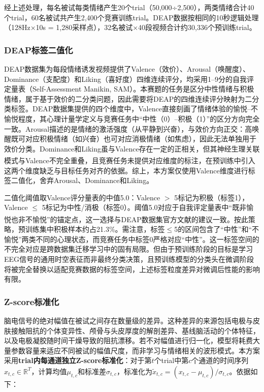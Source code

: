 \documentclass[UTF8,zihao=-4,fontset=windows]{ctexart}
\let\oldcite\cite
\renewcommand{\cite}[1]{\textsuperscript{\oldcite{#1}}}
\numberwithin{equation}{section}
\numberwithin{figure}{section}
\numberwithin{table}{section}
\begin{document}
经上述处理，每名被试每类情绪产生20个trial（50,000÷2,500），两类情绪合计40个trial，60名被试共产生2,400个竞赛训练trial。DEAP数据按相同的10秒逻辑处理（128Hz×10s = 1,280采样点），32名被试×40段视频合计约30,336个预训练trial。

\subsubsection{DEAP标签二值化}

DEAP数据集为每段情绪诱发视频提供了Valence（效价）、Arousal（唤醒度）、Dominance（支配度）和Liking（喜好度）四维连续评分，均采用1--9分的自我评定量表（Self-Assessment Manikin, SAM）。本赛题的任务是区分中性情绪与积极情绪，属于基于效价的二分类问题，因此需要将DEAP的四维连续评分映射为二分类标签。DEAP数据集提供的四个维度中，Valence直接刻画了情绪体验的愉悦--不愉悦程度，其心理计量学定义与竞赛任务中“中性（0）--积极（1）”的区分方向完全一致。Arousal描述的是情绪的激活强度（从平静到兴奋），与效价方向正交：高唤醒既可对应积极情绪（如兴奋）也可对应消极情绪（如焦虑），因此无法单独用于效价分类。Dominance和Liking虽与Valence存在一定的正相关，但其神经生理关联模式与Valence不完全重叠\cite{deap}，且竞赛任务未提供对应维度的标注，在预训练中引入这两个维度缺乏与目标任务对齐的依据。综上，本方案仅使用Valence维度进行标签二值化，舍弃Arousal、Dominance和Liking。

二值化阈值取Valence评分量表的中值5.0：Valence $>$ 5标记为积极（标签1），Valence $\leq$ 5标记为中性/消极（标签0）。阈值5.0对应于自我评定量表中“既非愉悦也非不愉悦”的锚定点，这一选择与DEAP数据集官方文献的建议一致\cite{deap}。按此策略，预训练集中积极样本约占21.3\%。需注意，标签$\leq$5的区间包含了“中性”和“不愉悦”两类不同的心理状态，而竞赛任务中标签0严格对应“中性”。这一标签空间的不完全对应是跨数据集迁移学习中的固有局限。但由于预训练阶段的目标是学习EEG信号的通用时空表征而非最终分类决策，且预训练模型的分类头在微调阶段将被完全替换以适配竞赛数据的标签空间，上述标签粒度差异对微调后性能的影响有限。

\subsubsection{Z-score标准化}

脑电信号的绝对幅值在被试之间存在数量级的差异。这种差异的来源包括电极与皮肤接触阻抗的个体变异性、颅骨与头皮厚度的解剖差异、基线脑活动的个体特征，以及电极凝胶随时间干燥导致的阻抗漂移。若不对幅值进行归一化，模型将耗费大量参数容量来适应不同被试的幅值尺度，而非学习与情绪相关的波形模式。本方案采用\textbf{trial内每通道独立Z-score标准化}：对于第$t$个trial中第$c$个通道的时间序列$x_{t,c} \in \mathbb{R}^{T}$，计算均值$\mu_{t,c}$和标准差$\sigma_{t,c}$，标准化为$\tilde{x}_{t,c} = (x_{t,c} - \mu_{t,c}) / \sigma_{t,c}$。依据如下：
\end{document}
